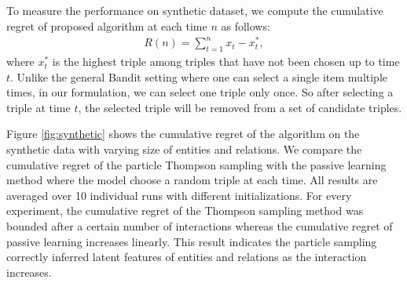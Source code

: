 To measure the performance on synthetic dataset, we compute the cumulative regret of proposed algorithm at each time $n$ as follows:
\begin{align}
R(n) = \sum_{t=1}^{n} x_t - x^{*}_t,
\end{align}
where $x^*_t$ is the highest triple among triples that have not been chosen up to time $t$. Unlike the general Bandit setting where one can select a single item multiple times, in our formulation, we can select one triple only once. So after selecting a triple at time $t$, the selected triple will be removed from a set of candidate triples.

Figure \ref{fig:synthetic} shows the cumulative regret of the algorithm on the synthetic data with varying size of entities and relations. We compare the cumulative regret of the particle Thompson sampling with the passive learning method where the model choose a random triple at each time. All results are averaged over 10 individual runs with different initializations. For every experiment, the cumulative regret of the Thompson sampling method was bounded after a certain number of interactions whereas the cumulative regret of passive learning increases linearly. This result indicates the particle sampling correctly inferred latent features of entities and relations as the interaction increases.

